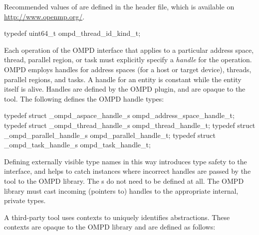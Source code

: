 Recommended values of  are defined in the  
header file, which is available on \url{http://www.openmp.org/}. 

\label{ompd:ompd_thread_id_kind_t}
\format

\begin{ccppspecific}
\begin{ompSyntax}
typedef uint64_t ompd_thread_id_kind_t;
\end{ompSyntax}
\end{ccppspecific}


\label{ompd:ompd_address_space_handle_t}
\label{ompd:ompd_thread_handle_t}
\label{ompd:ompd_parallel_handle_t}
\label{ompd:ompd_task_handle_t}

Each operation of the OMPD interface that applies to a particular address space, thread, parallel 
region, or task must explicitly specify
a \emph{handle} for the operation.
OMPD employs handles for address spaces (for a host or target device), threads, parallel regions, 
and tasks. A handle for an entity is constant while the entity itself is alive. Handles are defined by 
the OMPD plugin, and are opaque to the tool. The following defines the OMPD 
handle types:

\format

\begin{ccppspecific}
\begin{ompSyntax}
typedef struct _ompd_aspace_handle_s ompd_address_space_handle_t;
typedef struct _ompd_thread_handle_s ompd_thread_handle_t;
typedef struct _ompd_parallel_handle_s ompd_parallel_handle_t;
typedef struct _ompd_task_handle_s ompd_task_handle_t;
\end{ompSyntax}
\end{ccppspecific}


Defining externally visible type names in this way introduces type safety to the interface, and helps 
to catch instances where incorrect handles are passed by the tool to the OMPD 
library. The s do not need to be defined at all. The OMPD library 
must cast incoming (pointers to) handles to the appropriate internal, private types.

\label{ompd:ompd_address_space_context_t}
\label{ompd:ompd_thread_context_t}

A third-party tool uses contexts to uniquely  identifies abstractions. These contexts are opaque to 
the OMPD library and are defined as follows:


